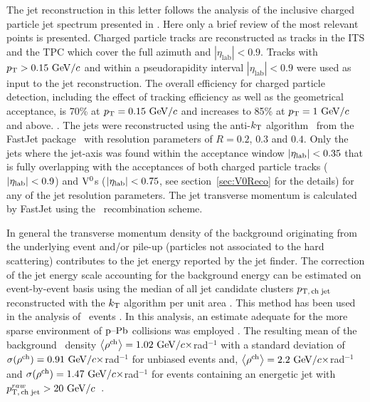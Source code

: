 The jet reconstruction in this letter follows the analysis of the inclusive charged particle jet spectrum presented in \cite{Adam:2015hoa}. Here only a brief review of the most relevant points is presented.
Charged particle tracks are reconstructed as tracks in the ITS and the TPC which cover the full azimuth and $|\eta_\mathrm{lab}| < 0.9$. 
Tracks with $p_{\mathrm{T}} > 0.15 \mathrm{~GeV}/c$ and within a pseudorapidity interval $|\eta_\mathrm{lab}|<0.9$ were used as input to the jet reconstruction.
The overall efficiency for charged particle detection, including the effect of tracking efficiency as well as the geometrical acceptance, is 70\% at $p_{\mathrm{T}} = 0.15 \mbox{~GeV}/c$ and increases to 85\% at $p_{\mathrm{T}} = 1 \mbox{~GeV}/c$ and above. 
.
The jets were reconstructed using the anti-$k_{\rm T}$ algorithm~\cite{Cacciari:2008gp} from the FastJet package~\cite{Cacciari:2011ma,Cacciari:2005hq} with resolution parameters of $R=0.2$, $0.3$ and $0.4$. 
Only the jets where the jet-axis was found within the acceptance window $\left|\eta_{\rm lab}\right|<0.35$ that is fully overlapping with the acceptances of both charged particle tracks ($\left|\eta_{\rm lab}\right|<0.9$) and ${\rm V}^{0}$s ($\left|\eta_{\rm lab}\right|<0.75$, see section~\ref{sec:V0Reco} for the details) for any of the jet resolution parameters.
The jet transverse momentum is calculated by FastJet using the \pt\ recombination scheme. 

In general the transverse momentum density of the background originating from the underlying event and/or pile-up (particles not associated to the hard scattering) contributes to the jet energy reported by the jet finder. 
The correction of the jet energy scale accounting for the background energy can be estimated on event-by-event basis using the median of all jet candidate clusters $p_\mathrm{T,\,ch\;jet}$ reconstructed with the $k_{\textnormal{T}}$ algorithm per unit area \cite{Cacciari:2008gn}. 
This method has been used in the analysis of \PbPb\ events \cite{Abelev:2013kqa,Adam:2015ewa}.
In this analysis, an estimate adequate for the more sparse environment of $\mbox{p--Pb}$ collisions was employed \cite{Adam:2015hoa}. The resulting mean of the background \pt\ density $\left\langle\rho^{\rm ch}\right\rangle=1.02~\mathrm{GeV}/c\times$rad$^{-1}$ with a standard deviation of $\sigma(\rho^{\rm ch})=0.91~\mathrm{GeV}/c\times$rad$^{-1}$ for unbiased events and, $\left\langle\rho^{\rm ch}\right\rangle=2.2~\mathrm{GeV}/c\times$rad$^{-1}$ and $\sigma(\rho^{\rm ch})=1.47~\mathrm{GeV}/c\times$rad$^{-1}$ for events containing an energetic jet with $p_\mathrm{T,\,ch\;jet}^{raw}>20~\mathrm{GeV}/c$~\cite{Adam:2015hoa}.

